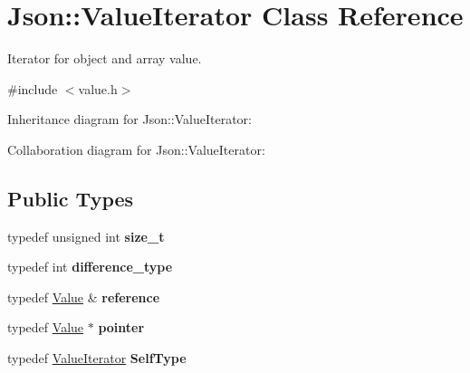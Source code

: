 \hypertarget{class_json_1_1_value_iterator}{\section{Json\+:\+:Value\+Iterator Class Reference}
\label{class_json_1_1_value_iterator}
}


Iterator for object and array value.  




{\ttfamily \#include $<$value.\+h$>$}



Inheritance diagram for Json\+:\+:Value\+Iterator\+:


Collaboration diagram for Json\+:\+:Value\+Iterator\+:
\subsection*{Public Types}
\begin{DoxyCompactItemize}
\item 
\hypertarget{class_json_1_1_value_iterator_a308b8932ffc83eaa9d12dadd5c11a7dd}{typedef unsigned int {\bfseries size\+\_\+t}}\label{class_json_1_1_value_iterator_a308b8932ffc83eaa9d12dadd5c11a7dd}

\item 
\hypertarget{class_json_1_1_value_iterator_a2be1a9aa60bbfc8812e9dd1a7f1a8786}{typedef int {\bfseries difference\+\_\+type}}\label{class_json_1_1_value_iterator_a2be1a9aa60bbfc8812e9dd1a7f1a8786}

\item 
\hypertarget{class_json_1_1_value_iterator_ae87929b4567aa00372cf602c43b57160}{typedef \hyperlink{class_json_1_1_value}{Value} \& {\bfseries reference}}\label{class_json_1_1_value_iterator_ae87929b4567aa00372cf602c43b57160}

\item 
\hypertarget{class_json_1_1_value_iterator_acec45feb1ef1f3bf81240157d06d5432}{typedef \hyperlink{class_json_1_1_value}{Value} $\ast$ {\bfseries pointer}}\label{class_json_1_1_value_iterator_acec45feb1ef1f3bf81240157d06d5432}

\item 
\hypertarget{class_json_1_1_value_iterator_a23357670fdad61792670d86f62db7e16}{typedef \hyperlink{class_json_1_1_value_iterator}{Value\+Iterator} {\bfseries Self\+Type}}\label{class_json_1_1_value_iterator_a23357670fdad61792670d86f62db7e16}

\end{DoxyCompactItemize}
